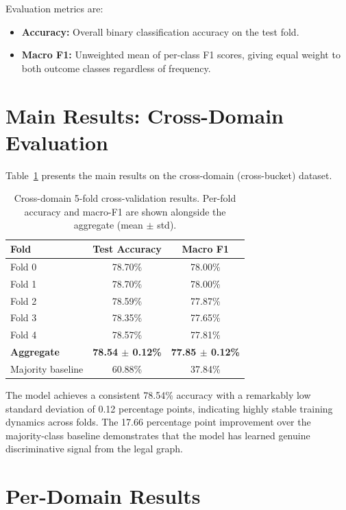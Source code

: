 \documentclass[12pt,a4paper]{report}
\begin{document}
Evaluation metrics are:
\begin{itemize}
  \item \textbf{Accuracy:} Overall binary classification accuracy on the test fold.
  \item \textbf{Macro F1:} Unweighted mean of per-class F1 scores, giving equal weight to both outcome classes regardless of frequency.
\end{itemize}

\section{Main Results: Cross-Domain Evaluation}
\label{sec:main_results}

Table~\ref{tab:main_results_cross} presents the main results on the cross-domain (cross-bucket) dataset.

\begin{table}[H]
  \centering
  \caption{Cross-domain 5-fold cross-validation results. Per-fold accuracy and macro-F1 are shown alongside the aggregate (mean $\pm$ std).}
  \label{tab:main_results_cross}
  \begin{tabular}{lcc}
    \toprule
    \textbf{Fold} & \textbf{Test Accuracy} & \textbf{Macro F1} \\
    \midrule
    Fold 0 & 78.70\% & 78.00\% \\
    Fold 1 & 78.70\% & 78.00\% \\
    Fold 2 & 78.59\% & 77.87\% \\
    Fold 3 & 78.35\% & 77.65\% \\
    Fold 4 & 78.57\% & 77.81\% \\
    \midrule
    \textbf{Aggregate} & \textbf{78.54 $\pm$ 0.12\%} & \textbf{77.85 $\pm$ 0.12\%} \\
    \midrule
    Majority baseline & 60.88\% & 37.84\% \\
    \bottomrule
  \end{tabular}
\end{table}

The model achieves a consistent 78.54\% accuracy with a remarkably low standard deviation of 0.12 percentage points, indicating highly stable training dynamics across folds. The 17.66 percentage point improvement over the majority-class baseline demonstrates that the model has learned genuine discriminative signal from the legal graph.

\section{Per-Domain Results}
\label{sec:per_domain_results}
\end{document}
